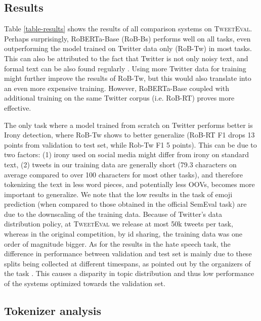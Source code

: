 \documentclass[11pt,a4paper]{article}
\begin{document}
\subsection{Results}



Table \ref{table-results} shows the results of all comparison systems on \textsc{TweetEval}. Perhaps surprisingly, RoBERTa-Base (RoB-Bs) performs well on all tasks, even outperforming the model trained on Twitter data only (RoB-Tw) in most tasks. This can also be attributed to the fact that Twitter is not only noisy text, and formal text can be also found regularly \cite{hu2013dude,xu2017shakespeare}. Using more Twitter data for training might further improve the results of RoB-Tw, but this would also translate into an even more expensive training.
However, RoBERTa-Base coupled with additional training on the same Twitter corpus (i.e. RoB-RT) proves more effective.

The only task where a model trained from scratch on Twitter performs better is Irony detection, where RoB-Tw shows to better generalize (RoB-RT F1 drops 13 points from validation to test set, while Rob-Tw F1 5 points).  This can be due to two factors: (1) irony used on social media might differ from irony on standard text, (2) tweets in our training data are generally short (79.3 characters on average compared to over 100 characters for most other tasks), and therefore tokenizing the text in less word pieces, and potentially less OOVs, becomes more important to generalize.
We note that the low results in the task of emoji prediction (when compared to those obtained in the official SemEval task) are due to the downscaling of the training data. Because of Twitter's data distribution policy, at \textsc{TweetEval} we release at most 50k tweets per task, whereas in the original competition, by id sharing, the training data was one order of magnitude bigger. As for the results in the hate speech task, the difference in performance between validation and test set is mainly due to these splits being collected at different timespans, as pointed out by the organizers of the task \cite{basile-etal-2019-semeval}. This causes a disparity in topic distribution and thus low performance of the systems optimized towards the validation set.









\subsection{Tokenizer analysis}
\end{document}
